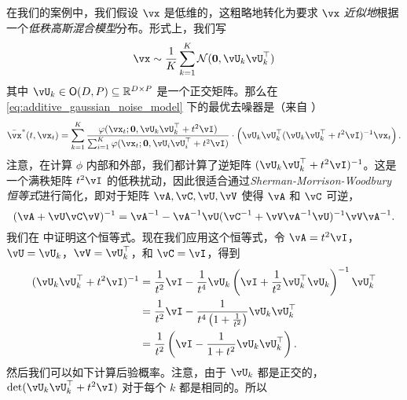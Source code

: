 \documentclass[../../book-main_zh.tex]{subfiles}
\begin{document}
在我们的案例中，我们假设 \(\vx\) 是低维的，这粗略地转化为要求 \(\vx\) \textit{近似地}根据一个\textit{低秩高斯混合模型}分布。形式上，我们写
\begin{equation}\label{eq:MoG1}
	\vx \sim \frac{1}{K}\sum_{k = 1}^{K}\dNorm(\vzero, \vU_{k}\vU_{k}^{\top})
\end{equation}
其中 \(\vU_{k} \in \O(D, P) \subseteq \R^{D \times P}\) 是一个正交矩阵。那么在 \eqref{eq:additive_gaussian_noise_model} 下的最优去噪器是（来自 ）
\begin{equation}
	\bar{\vx}^{\ast}(t, \vx_{t}) = \sum_{k = 1}^{K}\frac{\phi(\vx_{t} ; \vzero,
	\vU_{k}\vU_{k}^{\top} + t^{2}\vI)}{\sum_{i = 1}^{K}\phi(\vx_{t} ; \vzero, \vU_{i}\vU_{i}^{\top} + t^{2}\vI)}\cdot\bp{\vU_{k}\vU_{k}^{\top}(\vU_{k}\vU_{k}^{\top} + t^{2}\vI)^{-1}\vx_{t}}.
\end{equation}
注意，在计算 \(\phi\) 内部和外部，我们都计算了逆矩阵 \((\vU_{k}\vU_{k}^{\top} + t^{2}\vI)^{-1}\)。这是一个满秩矩阵 \(t^{2}\vI\) 的低秩扰动，因此很适合通过\textit{Sherman-Morrison-Woodbury 恒等式}进行简化，即对于矩阵 \(\vA, \vC, \vU, \vV\) 使得 \(\vA\) 和 \(\vC\) 可逆，
\begin{equation}\label{eq:sherman_morrison_woodbury}
	(\vA + \vU\vC\vV)^{-1} = \vA^{-1} - \vA^{-1}\vU(\vC^{-1} + \vV\vA^{-1}\vU)^{-1}\vV\vA^{-1}.
\end{equation}
我们在  中证明这个恒等式。现在我们应用这个恒等式，令 \(\vA = t^{2}\vI\)，\(\vU = \vU_{k}\)，\(\vV = \vU_{k}^{\top}\)，和 \(\vC = \vI\)，得到
\begin{align}
	(\vU_{k}\vU_{k}^{\top} + t^{2}\vI)^{-1} 
	&= \frac{1}{t^{2}}\vI - \frac{1}{t^{4}}\vU_{k}\bp{\vI + \frac{1}{t^{2}}\vU_{k}^{\top}\vU_{k}}^{-1}\vU_{k}^{\top} \\
	&= \frac{1}{t^{2}}\vI - \frac{1}{t^{4}\bp{1 + \frac{1}{t^{2}}}}\vU_{k}\vU_{k}^{\top} \\
	&= \frac{1}{t^{2}}\bp{\vI - \frac{1}{1 + t^{2}}\vU_{k}\vU_{k}^{\top}}.
\end{align}
然后我们可以如下计算后验概率。注意，由于 \(\vU_{k}\) 都是正交的，\(\det(\vU_{k}\vU_{k}^{\top} + t^{2}\vI)\) 对于每个 \(k\) 都是相同的。所以
\end{document}
